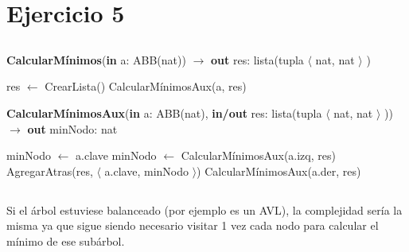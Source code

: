 \section{Ejercicio 5}

\subsection{}

\begin{algorithm}[H]
\caption{
    \textbf{CalcularMínimos}(\textbf{in} a: ABB(nat)) $\to$ \textbf{out} res: lista(tupla $\langle$ nat, nat $\rangle$ )
}
\begin{algorithmic}[1]
    \State res $\gets$ CrearLista() 
        \State CalcularMínimosAux(a, res) 
    \EndIf
\end{algorithmic}
\end{algorithm}

\begin{algorithm}[H]
\caption{
    \textbf{CalcularMínimosAux}(\textbf{in} a: ABB(nat), \textbf{in/out} res: lista(tupla $\langle$ nat, nat $\rangle$ )) $\to$ \textbf{out} minNodo: nat
}
\begin{algorithmic}[1]
    \State minNodo $\gets$ a.clave
        \State minNodo $\gets$ CalcularMínimosAux(a.izq, res)
    \EndIf
    \State AgregarAtras(res, $\langle$ a.clave, minNodo $\rangle$)
        \State CalcularMínimosAux(a.der, res)
    \EndIf
\end{algorithmic}
\end{algorithm}

\subsection{}

Si el árbol estuviese balanceado (por ejemplo es un AVL), la complejidad sería la misma ya que sigue siendo necesario visitar 1 vez cada nodo para calcular el mínimo de ese subárbol.
